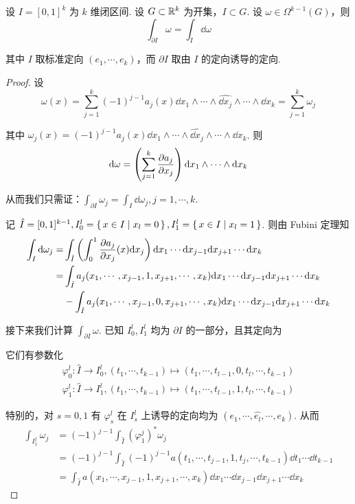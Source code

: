 \begin{lemma}
    设 $I=[0,1]^k$ 为 $k$ 维闭区间. 设 $G\subset\mathbb{R}^k$ 为开集，$I\subset G$. 设 $\omega\in\Omega^{k-1}(G)$，则
$$
\int_{\partial I}\omega=\int_I\dd\omega
$$

    其中 $I$ 取标准定向 $(e_1,\cdots,e_k)$，而 $\partial I$ 取由 $I$ 的定向诱导的定向.
\end{lemma}
\begin{proof}
    设
$$
\omega(x)=\sum_{j=1}^k(-1)^{j-1}a_j(x)\dd x_1\wedge\cdots\wedge\widehat{\dd x_j}\wedge\cdots\wedge\dd x_k=\sum_{j=1}^k\omega_j
$$

    其中 $\omega_j(x)=(-1)^{j-1}a_j(x)\dd x_1\wedge\cdots\wedge\widehat{\dd x_j}\wedge\cdots\wedge\dd x_k$. 则
$$
\mathrm{d}\omega=\left(\sum_{j=1}^k\frac{\partial{a_j}}{\partial{x_j}}\right)\mathrm{d} x_1\wedge\cdots\wedge\mathrm{d} x_k
$$

    从而我们只需证：$\displaystyle\int_{\partial I}\omega_j=\int_I\dd\omega_j,j=1,\cdots,k$.

    记 $\hat{I}=[0,1]^{k-1},I_0^l=\set{x\in I|x_l=0},I_1^l=\set{x\in I|x_l=1}$. 则由 Fubini 定理知
$$
\begin{aligned}
    \int_I\mathrm{d}\omega_j=&\int_{\hat{I}}\left(\int_0^1\frac{\partial{a_j}}{\partial{x_j}}(x)\mathrm{d} x_j\right)\mathrm{d} x_1\cdots\mathrm{d} x_{j-1}\mathrm{d} x_{j+1}\cdots\mathrm{d} x_k\\
    =&\int_{\hat{I}}a_j(x_1,\cdots,x_{j-1},1,x_{j+1},\cdots,x_k)\mathrm{d} x_1\cdots\mathrm{d} x_{j-1}\mathrm{d} x_{j+1}\cdots\mathrm{d} x_k\\
    &-\int_{\hat{I}}a_j(x_1,\cdots,x_{j-1},0,x_{j+1},\cdots,x_k)\mathrm{d} x_1\cdots\mathrm{d} x_{j-1}\mathrm{d} x_{j+1}\cdots\mathrm{d} x_k
\end{aligned}
$$

    接下来我们计算 $\displaystyle\int_{\partial I}\omega$. 已知 $I_0^l,I_1^l$ 均为 $\partial I$ 的一部分，且其定向为


    它们有参数化
$$
\begin{aligned}
    \varphi_0^l:\hat{I}\to I_0^l,(t_1,\cdots,t_{k-1})\mapsto(t_1,\cdots,t_{l-1},0,t_l,\cdots,t_{k-1})\\
    \varphi_1^l:\hat{I}\to I_1^l,(t_1,\cdots,t_{k-1})\mapsto(t_1,\cdots,t_{l-1},1,t_l,\cdots,t_{k-1})
\end{aligned}
$$

    特别的，对 $s=0,1$ 有 $\varphi^l_{s}$ 在 $I_s^l$ 上诱导的定向均为 $(e_1,\cdots,\widehat{e_l},\cdots,e_k)$. 从而
$$
\begin{aligned}
    \int_{I_1^j}\omega_j&=(-1)^{j-1}\int_{\hat{I}}(\varphi_1^j)^*\omega_j\\
    &=(-1)^{j-1}\int_{\hat{I}}(-1)^{j-1}a(t_1,\cdots,t_{j-1},1,t_j,\cdots,t_{k-1})\dd t_1\cdots\dd t_{k-1}\\
    &=\int_{\hat{I}}a(x_1,\cdots,x_{j-1},1,x_{j+1},\cdots,x_k)\dd x_1\cdots\dd x_{j-1}\dd x_{j+1}\cdots\dd x_{k}
\end{aligned}
$$


\end{proof}
